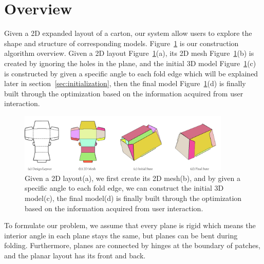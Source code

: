 \section{Overview}\label{sec:overview}
Given a 2D expanded layout of a carton, our system allow users to explore the shape and structure of corresponding models. Figure~\ref{fig:overview} is our construction algorithm overview. Given a 2D layout Figure~\ref{fig:overview}(a), its 2D mesh Figure~\ref{fig:overview}(b) is created by ignoring the holes in the plane, and the initial 3D model Figure~\ref{fig:overview}(c) is constructed by given a specific angle to each fold edge which will be explained later in section~\ref{sec:initialization}, then the final model Figure~\ref{fig:overview}(d) is finally built through the optimization based on the information acquired from user interaction. 

\begin{figure}
	\centering
	\includegraphics[width=0.9\textwidth]{images/overview.jpg}
	\caption{Given a 2D layout(a), we first create its 2D mesh(b), and by given a specific angle to each fold edge, we can construct the initial 3D model(c), the final model(d) is finally built through the optimization based on the information acquired from user interaction.}
	\label{fig:overview}
\end{figure} 

To formulate our problem, we assume that every plane is rigid which means the interior angle in each plane stays the same, but planes can be bent during folding. Furthermore, planes are connected by hinges at the boundary of patches, and the planar layout has its front and back.